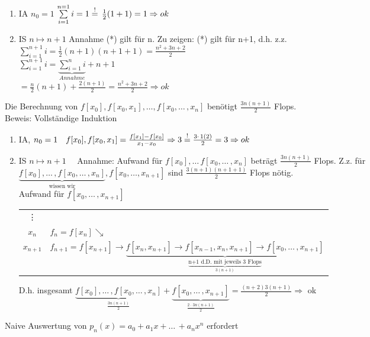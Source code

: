 \begin{enumerate}
	\item IA $n_0=1$ $\sum\limits_{i=1}^{n=1}{i}=1\overset{!}{=}\,\frac{1}{2}(1+1)=1 \Rightarrow ok$
	\item IS $n \mapsto n+1$ Annahme (*) gilt für n. Zu zeigen: (*) gilt für n+1, d.h. z.z.\\
	$\sum\limits_{i=1}^{n+1}{i}=\frac{1}{2}(n+1)(n+1+1)=\frac{n^2+3n+2}{2}$\\
	$\sum\limits_{i=1}^{n+1}{i}=\underbrace{\sum\limits_{i=1}^{n}{i}}_{Annahme} + n+1$ \\
	$=\frac{n}{2}(n+1) + \frac{2(n+1)}{2}= \frac{n^2+3n+2}{2} \Rightarrow ok$
\end{enumerate}

Die Berechnung von $f[x_0], f[x_0,x_1],\ldots,f[x_0,\ldots\,,x_n]$ benötigt $\frac{3n(n+1)}{2}$ Flops. \\
Beweis: Vollständige Induktion\\

\begin{enumerate}
	\item IA, $n_0=1 \quad f[x_0],f[x_0,x_1]=\frac{f[x_1]-f[x_0]}{x_1-x_0} \Rightarrow 3 \overset{!}{=} \frac{3\cdot\,1(2)}{2}=3 \Rightarrow ok$
	\item IS $n \mapsto n+1 \quad$ Annahme: Aufwand für $f[x_0], \ldots\,f[x_0,\ldots\,,x_n]$ beträgt $\frac{3n(n+1)}{2}$ Flops. Z.z. für $\underbrace{f[x_0], \ldots\,,f[x_0,\ldots\,,x_n]}_{\text{wissen wir}},f[x_0,\ldots,x_{n+1}]$ sind $\frac{3(n+1)(n+1+1)}{2}$ Flops nötig. \\
Aufwand für $f[x_0,\ldots\,,x_{n+1}]$\\
\begin{tabular}{c|l}
\vdots \\
$x_{n}$ & $f_{n} = f[x_{n}] \searrow$\\
$x_{n+1}$ & $f_{n+1} = f[x_{n+1}] \rightarrow \underbrace{f[x_n,x_{n+1}] \rightarrow f[x_{n-1},x_n,x_{n+1}] \rightarrow f[x_0,\ldots\,,x_{n+1}]}_{\underbrace{\text{n+1 d.D. mit jeweils 3 Flops}}_{3(n+1)}}$ 
\end{tabular}

D.h. insgesamt $\underbrace{f[x_0],\ldots\,,f[x_0,\ldots\,,x_n]}_{\frac{3n(n+1)}{2}} + \underbrace{f[x_0,\ldots\,,x_{n+1}]}_{\frac{2\cdot\,3n(n+1)}{2}} = \frac{(n+2)3(n+1)}{2} \Rightarrow $ ok
\end{enumerate}

Naive Auswertung von $p_n(x) = a_0+a_1x+\ldots\,+a_nx^n$ erfordert 

